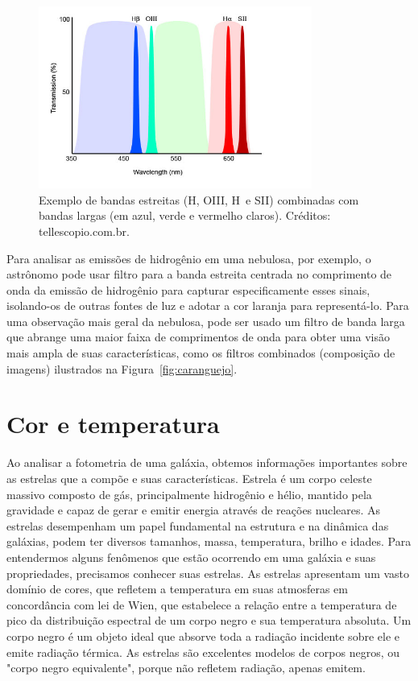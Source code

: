 \begin{figure}[h]
  \centering 
  \includegraphics[width=0.8\textwidth]{Imagens/narrowbandandbroadband.jpg} 
  \caption[Exemplo de bandas estreitas combinadas com bandas largas.]{Exemplo de bandas estreitas (H\textbeta, OIII, H\textalpha\ e SII) combinadas com bandas largas (em azul, verde e vermelho claros). Créditos: tellescopio.com.br.}
  \label{fig:narrowbandandbroadband} 
\end{figure}

Para analisar as emissões de hidrogênio em uma nebulosa, por exemplo, o astrônomo pode usar filtro para a banda estreita centrada no comprimento de onda da emissão de hidrogênio para capturar especificamente esses sinais, isolando-os de outras fontes de luz e adotar a cor laranja para representá-lo. Para uma observação mais geral da nebulosa, pode ser usado um filtro de banda larga que abrange uma maior faixa de comprimentos de onda para obter uma visão mais ampla de suas características, como os filtros combinados (composição de imagens) ilustrados na Figura~\ref{fig:caranguejo}.

\section{Cor e temperatura}

Ao analisar a fotometria de uma galáxia, obtemos informações importantes sobre as estrelas que a compõe e suas características. Estrela é um corpo celeste massivo composto de gás, principalmente hidrogênio e hélio, mantido pela gravidade e capaz de gerar e emitir energia através de reações nucleares. As estrelas desempenham um papel fundamental na estrutura e na dinâmica das galáxias, podem ter diversos tamanhos, massa, temperatura, brilho e idades. Para entendermos alguns fenômenos que estão ocorrendo em uma galáxia e suas propriedades, precisamos conhecer suas estrelas. As estrelas apresentam um vasto domínio de cores, que refletem a temperatura em suas atmosferas em concordância com lei de Wien, que estabelece a relação entre a temperatura de pico da distribuição espectral de um corpo negro e sua temperatura absoluta. Um corpo negro é um objeto ideal que absorve toda a radiação incidente sobre ele e emite radiação térmica. As estrelas são excelentes modelos de corpos negros, ou "corpo negro equivalente", porque não refletem radiação, apenas emitem.

